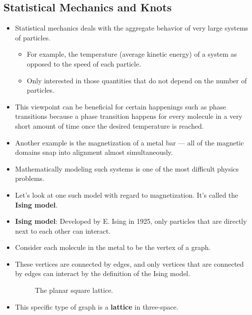 \documentclass[titlepage]{article}
\numberwithin{figure}{section}
\numberwithin{table}{section}
\numberwithin{equation}{section}
\begin{document}
\subsection{Statistical Mechanics and Knots}
\begin{itemize}
    \item Statistical mechanics deals with the aggregate behavior of very large systems of particles.
    \begin{itemize}
        \item For example, the temperature (average kinetic energy) of a system as opposed to the speed of each particle.
        \item Only interested in those quantities that do not depend on the number of particles.
    \end{itemize}
    \item This viewpoint can be beneficial for certain happenings such as phase transitions because a phase transition happens for every molecule in a very short amount of time once the desired temperature is reached.
    \item Another example is the magnetization of a metal bar --- all of the magnetic domains snap into alignment almost simultaneously.
    \item Mathematically modeling such systems is one of the most difficult physics problems.
    \item Let's look at one such model with regard to magnetization. It's called the \textbf{Ising model}.
    \item \textbf{Ising model}: Developed by E. Ising in 1925, only particles that are directly next to each other can interact.
    \item Consider each molecule in the metal to be the vertex of a graph.
    \item These vertices are connected by edges, and only vertices that are connected by edges can interact by the definition of the Ising model.
    \begin{figure}[h!]
        \centering
        \caption{The planar square lattice.}
        \label{fig:2-lattice}
    \end{figure}
    \item This specific type of graph is a \textbf{lattice} in three-space.

\end{itemize}
\end{document}
